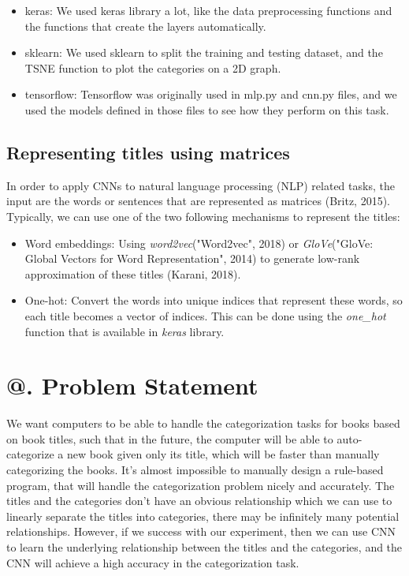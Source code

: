 \documentclass[jou,apacite, 10px]{apa6}
\makeatletter
\newcommand*{\rom}[1]{\expandafter\@slowromancap\romannumeral #1@}
\makeatother
\begin{document}
\begin{itemize}
\item keras: We used keras library a lot, like the data preprocessing functions and the functions that create the layers automatically.
\item sklearn: We used sklearn to split the training and testing dataset, and the TSNE function to plot the categories on a 2D graph.
\item tensorflow: Tensorflow was originally used in mlp.py and cnn.py files, and we used the models defined in those files to see how they perform on this task.
\end{itemize}

\subsection{Representing titles using matrices}
In order to apply CNNs to natural language processing (NLP) related tasks, the input are the words or sentences that are represented as matrices (Britz, 2015). Typically, we can use one of the two following mechanisms to represent the titles:
\begin{itemize}
\item Word embeddings: Using \textit{word2vec}("Word2vec", 2018) or \textit{GloVe}("GloVe: Global Vectors for Word Representation", 2014) to generate low-rank approximation of these titles (Karani, 2018).
\item One-hot: Convert the words into unique indices that represent these words, so each title becomes a vector of indices. This can be done using the \textit{one\_hot} function that is available in \textit{keras} library.
\end{itemize}

\section{\rom{3}. Problem Statement}

We want computers to be able to handle the categorization tasks for books based on book titles, such that in the future, the computer will be able to auto-categorize a new book given only its title, which will be faster than manually categorizing the books. It's almost impossible to manually design a rule-based program, that will handle the categorization problem nicely and accurately. The titles and the categories don't have an obvious relationship which we can use to linearly separate the titles into categories, there may be infinitely many potential relationships. However, if we success with our experiment, then we can use CNN to learn the underlying relationship between the titles and the categories, and the CNN will achieve a high accuracy in the categorization task.
\end{document}
